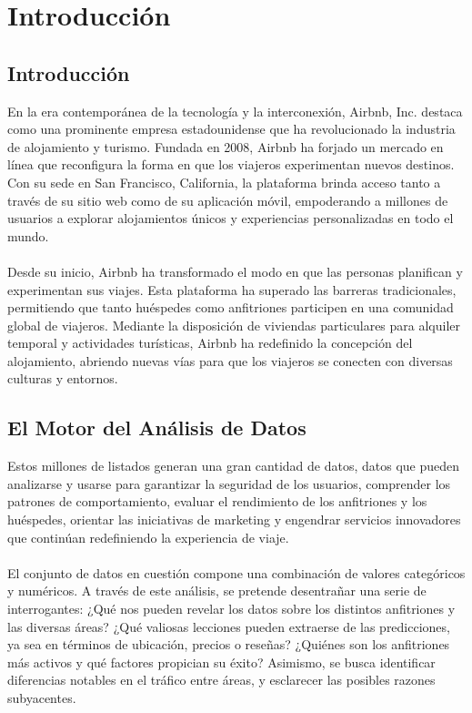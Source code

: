 \section{Introducción}

\subsection{Introducción}

En la era contemporánea de la tecnología y la interconexión, Airbnb, Inc. destaca como una prominente empresa estadounidense que ha revolucionado la industria de alojamiento y turismo. Fundada en 2008, Airbnb ha forjado un mercado en línea que reconfigura la forma en que los viajeros experimentan nuevos destinos. Con su sede en San Francisco, California, la plataforma brinda acceso tanto a través de su sitio web como de su aplicación móvil, empoderando a millones de usuarios a explorar alojamientos únicos y experiencias personalizadas en todo el mundo.\\\\
Desde su inicio, Airbnb ha transformado el modo en que las personas planifican y experimentan sus viajes. Esta plataforma ha superado las barreras tradicionales, permitiendo que tanto huéspedes como anfitriones participen en una comunidad global de viajeros. Mediante la disposición de viviendas particulares para alquiler temporal y actividades turísticas, Airbnb ha redefinido la concepción del alojamiento, abriendo nuevas vías para que los viajeros se conecten con diversas culturas y entornos.

\subsection{El Motor del Análisis de Datos}

Estos millones de listados generan una gran cantidad de datos, datos que
pueden analizarse y usarse para garantizar la seguridad de los usuarios, comprender los patrones de comportamiento, evaluar el rendimiento de los anfitriones y los huéspedes, orientar las iniciativas de marketing y engendrar servicios innovadores que continúan redefiniendo la experiencia de viaje.\\\\
El conjunto de datos en cuestión compone una combinación de valores categóricos y numéricos. A través de este análisis, se pretende desentrañar una serie de interrogantes: ¿Qué nos pueden revelar los datos sobre los distintos anfitriones y las diversas áreas? ¿Qué valiosas lecciones pueden extraerse de las predicciones, ya sea en términos de ubicación, precios o reseñas? ¿Quiénes son los anfitriones más activos y qué factores propician su éxito? Asimismo, se busca identificar diferencias notables en el tráfico entre áreas, y esclarecer las posibles razones subyacentes.


